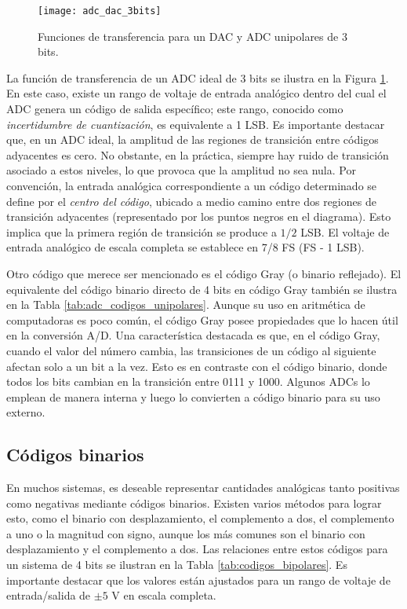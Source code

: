     \begin{figure}[!h]
      \centering
      \texttt{[image: adc\_dac\_3bits]}
      \caption{Funciones de transferencia para un DAC y ADC unipolares de 3 bits.}
      \label{fig:adc_dac_3bits}
    \end{figure}

    La función de transferencia de un ADC ideal de 3 bits se ilustra en la Figura \ref{fig:adc_dac_3bits}. En este caso, existe un rango de voltaje de entrada analógico dentro del cual el ADC genera un código de salida específico; este rango, conocido como \textit{incertidumbre de cuantización}, es equivalente a 1 LSB. Es importante destacar que, en un ADC ideal, la amplitud de las regiones de transición entre códigos adyacentes es cero. No obstante, en la práctica, siempre hay ruido de transición asociado a estos niveles, lo que provoca que la amplitud no sea nula. Por convención, la entrada analógica correspondiente a un código determinado se define por el \textit{centro del código}, ubicado a medio camino entre dos regiones de transición adyacentes (representado por los puntos negros en el diagrama). Esto implica que la primera región de transición se produce a $1/2$ LSB. El voltaje de entrada analógico de escala completa se establece en 7/8 FS (FS - 1 LSB).

    Otro código que merece ser mencionado es el código Gray (o binario reflejado). El equivalente del código binario directo de 4 bits en código Gray también se ilustra en la Tabla \ref{tab:adc_codigos_unipolares}. Aunque su uso en aritmética de computadoras es poco común, el código Gray posee propiedades que lo hacen útil en la conversión A/D. Una característica destacada es que, en el código Gray, cuando el valor del número cambia, las transiciones de un código al siguiente afectan solo a un bit a la vez. Esto es en contraste con el código binario, donde todos los bits cambian en la transición entre 0111 y 1000. Algunos ADCs lo emplean de manera interna y luego lo convierten a código binario para su uso externo.

    \subsection{Códigos binarios}

    En muchos sistemas, es deseable representar cantidades analógicas tanto positivas como negativas mediante códigos binarios. Existen varios métodos para lograr esto, como el binario con desplazamiento, el complemento a dos, el complemento a uno o la magnitud con signo, aunque los más comunes son el binario con desplazamiento y el complemento a dos. Las relaciones entre estos códigos para un sistema de 4 bits se ilustran en la Tabla \ref{tab:codigos_bipolares}. Es importante destacar que los valores están ajustados para un rango de voltaje de entrada/salida de $\pm 5$ V en escala completa.

